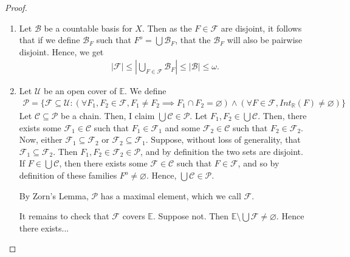 \documentclass[12pt]{extarticle}
\newcommand{\abs}[1]{|#1|}
\newcommand{\set}[1]{\{#1\}}
\newcommand{\R}{\mathbb{R}}
\newcommand{\<}{\langle}
\renewcommand{\>}{\rangle}
\renewcommand{\emptyset}{\varnothing}
\theoremstyle{definition}
\begin{document}
\begin{proof}
  \begin{enumerate}
  \item
    Let $\mathcal{B}$ be a countable basis for $X$. Then as the $F \in \mathcal{F}$ are disjoint, it follows that if we define $\mathcal{B}_F$ such that
    $F^o = \bigcup \mathcal{B}_F$, that the $\mathcal{B}_F$ will also be pairwise disjoint. Hence, we get
    \begin{align*}
      \abs{\mathcal{F}} \leq \abs{\bigcup\limits_{F \in \mathcal{F}} \mathcal{B}_F} \leq \abs{\mathcal{B}} \leq \omega .
    \end{align*}
  \item
    Let $\mathcal{U}$ be an open cover of $\mathbb{E}$. We define
    \begin{align*}
      \mathcal{P} = \set{\mathcal{F} \subseteq \mathcal{U}: (\forall F_1, F_2 \in \mathcal{F},
        F_1 \neq F_2 \implies F_1 \cap F_2 = \emptyset) \wedge
        (\forall F \in \mathcal{F}, Int_{\R}(F) \neq \emptyset)}
    \end{align*}
    Let $\mathcal{C} \subseteq \mathcal{P}$ be a chain. Then, I claim $\bigcup \mathcal{C} \in \mathcal{P}$. Let $F_1, F_2 \in \bigcup \mathcal{C}$.
    Then, there exists some $\mathcal{F}_1 \in \mathcal{C}$ such that $F_1 \in \mathcal{F}_1$ and some $\mathcal{F}_2 \in \mathcal{C}$ such that $F_2 \in \mathcal{F}_2$. Now,
    either $\mathcal{F}_1 \subseteq \mathcal{F}_2$ or $\mathcal{F}_2 \subseteq \mathcal{F}_1$. Suppose, without loss of generality, that $\mathcal{F}_1 \subseteq \mathcal{F}_2$.
    Then $F_1, F_2 \in \mathcal{F}_2 \in \mathcal{P}$, and by definition the two sets are disjoint. If $F \in \bigcup \mathcal{C}$, then there exists some $\mathcal{F} \in \mathcal{C}$ such that $F \in \mathcal{F}$, and so by definition of these families $F^o \neq \emptyset$. Hence, $\bigcup \mathcal{C} \in \mathcal{P}$.

    By Zorn's Lemma, $\mathcal{P}$ has a maximal element, which we call $\mathcal{F}$.

    It remains to check that $\mathcal{F}$ covers $\mathbb{E}$. Suppose not. Then $\mathbb{E} \setminus \bigcup \mathcal{F} \neq \emptyset$. Hence there exists...

    
  \end{enumerate}
\end{proof}
\end{document}
